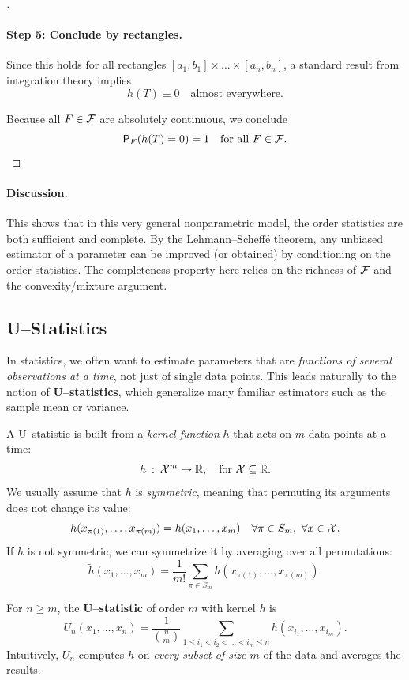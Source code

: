 \begin{proof}[]
\paragraph{Step 5: Conclude by rectangles.}  
Since this holds for all rectangles \([a_1, b_1] \times \dots \times [a_n, b_n]\), a standard result from integration theory implies
\[
h(T) \equiv 0 \quad \text{almost everywhere.}
\]

Because all \(F \in \mathcal{F}\) are absolutely continuous, we conclude
\[
\mathsf{P}_F(h(T) = 0) = 1 \quad \text{for all } F \in \mathcal{F}.
\]
\end{proof}
\paragraph{Discussion.}  
This shows that in this very general nonparametric model, the order statistics are both sufficient and complete. By the Lehmann–Scheffé theorem, any unbiased estimator of a parameter can be improved (or obtained) by conditioning on the order statistics. The completeness property here relies on the richness of \(\mathcal{F}\) and the convexity/mixture argument.

\subsection{U--Statistics}%
\label{sub:u-stats}

In statistics, we often want to estimate parameters that are \emph{functions of several observations at a time}, not just of single data points. This leads naturally to the notion of \textbf{U--statistics}, which generalize many familiar estimators such as the sample mean or variance.

\bigskip

A U--statistic is built from a \emph{kernel function} \(h\) that acts on \(m\) data points at a time:
\[
    h \: : \: \mathcal{X}^{m}\to\mathbb{R}, \quad \text{for }\mathcal{X}\subseteq \mathbb{R}.     
\]
We usually assume that \(h\) is \emph{symmetric}, meaning that permuting its arguments does not change its value:
\[
    h(x_{\pi(1)}, \dots, x_{\pi(m)})
    = h(x_{1}, \dots, x_{m}) \quad \forall \pi \in S_{m}, \ \forall x \in \mathcal{X}.
\]
If \(h\) is not symmetric, we can symmetrize it by averaging over all permutations:
\[
    \tilde{h}(x_1, \dots, x_m) = \frac{1}{m!}\sum_{\pi \in S_m} h(x_{\pi(1)}, \dots, x_{\pi(m)}).
\]

\begin{definition}[]
For \(n \ge m\), the \textbf{U--statistic} of order \(m\) with kernel \(h\) is
\[
    U_{n}(x_{1}, \dots, x_{n}) = \frac{1}{\binom{n}{m} }\sum_{1\le i_1<i_2<\dots <i_{m}\le n} h(x_{i_1}, \dots, x_{i_{m}}).
\]
Intuitively, \(U_n\) computes \(h\) on \emph{every subset of size \(m\)} of the data and averages the results. 
\end{definition}

